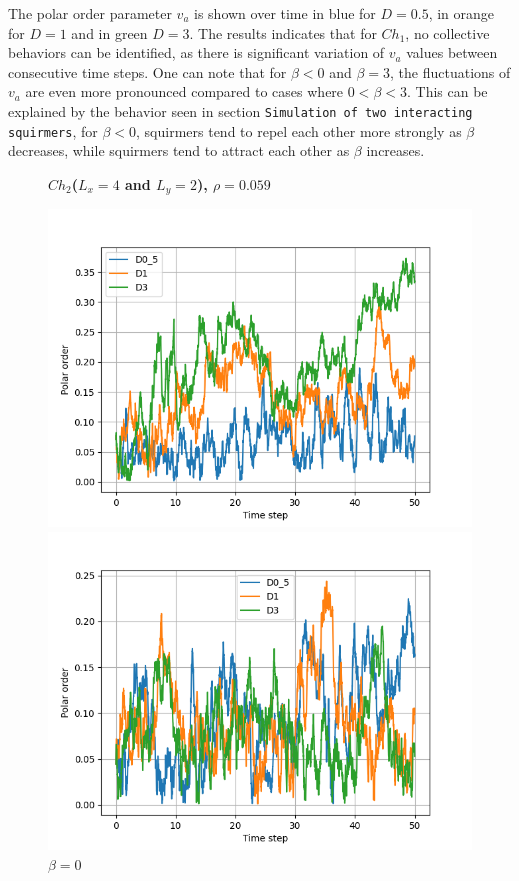 \documentclass{article}
\begin{document}
The polar order parameter $v_a$ is shown over time in blue for $D = 0.5$, in orange for $D = 1$ and in green $D=3$. 
The results indicates that for $Ch_1$, no collective behaviors can be identified, as there is significant variation of $v_a$ values
between consecutive time steps. One can note that for $\beta < 0$ and $\beta = 3$, the fluctuations of $v_a$ are 
even more pronounced compared to cases where $0 < \beta < 3$.
This can be explained by the behavior seen in section \texttt{Simulation of two interacting squirmers}, for $\beta <0$, squirmers
tend to repel each other more strongly as $\beta$ decreases, while squirmers tend to attract each other
as $\beta$ increases. 

\begin{figure}[H]
    \centering
    \textbf{$Ch_2$($L_x = 4$ and $L_y = 2$), $\rho = 0.059$}\par\medskip
    \begin{minipage}{0.49\textwidth}
        \includegraphics[width=1\textwidth]{videos/simulations/sim_D/beta0/dens_0_59/combined_polars.png}
        \caption{\footnotesize $\beta = 0$}
    \end{minipage}\hfill
    \begin{minipage}{0.49\textwidth}
        \includegraphics[width=1\textwidth]{videos/simulations/sim_D/beta1_5/dens_0_59/combined_polars.png}

\end{minipage}
\end{figure}
\end{document}
